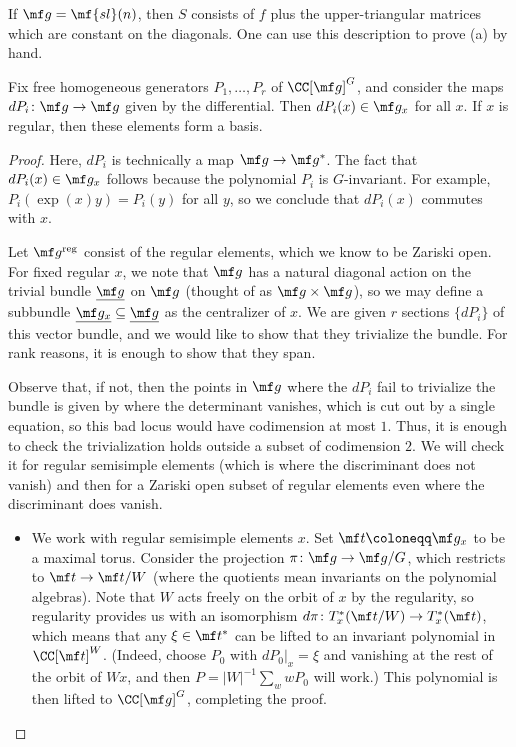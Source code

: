 \documentclass[../notes.tex]{subfiles}
\begin{document}
\begin{example}
	If $\mf g=\mf{sl}(n)$, then $S$ consists of $f$ plus the upper-triangular matrices which are constant on the diagonals. One can use this description to prove (a) by hand.
\end{example}
\begin{lemma} \label{lem:get-kostant-slice}
	Fix free homogeneous generators $P_1,\ldots,P_r$ of $\CC[\mf g]^G$, and consider the maps $dP_i\colon\mf g\to\mf g$ given by the differential. Then $dP_i(x)\in\mf g_x$ for all $x$. If $x$ is regular, then these elements form a basis.
\end{lemma}
\begin{proof}
	Here, $dP_i$ is technically a map $\mf g\to\mf g^*$. The fact that $dP_i(x)\in\mf g_x$ follows because the polynomial $P_i$ is $G$-invariant. For example, $P_i(\exp(x)y)=P_i(y)$ for all $y$, so we conclude that $dP_i(x)$ commutes with $x$.\todo{}

	Let $\mf g^{\mathrm{reg}}$ consist of the regular elements, which we know to be Zariski open. For fixed regular $x$, we note that $\mf g$ has a natural diagonal action on the trivial bundle $\underline{\mf g}$ on $\mf g$ (thought of as $\mf g\times\mf g$), so we may define a subbundle $\underline{\mf g_x}\subseteq\underline{\mf g}$ as the centralizer of $x$. We are given $r$ sections $\{dP_i\}$ of this vector bundle, and we would like to show that they trivialize the bundle. For rank reasons, it is enough to show that they span.
	
	Observe that, if not, then the points in $\mf g$ where the $dP_i$ fail to trivialize the bundle is given by where the determinant vanishes, which is cut out by a single equation, so this bad locus would have codimension at most $1$. Thus, it is enough to check the trivialization holds outside a subset of codimension $2$. We will check it for regular semisimple elements (which is where the discriminant does not vanish) and then for a Zariski open subset of regular elements even where the discriminant does vanish.
	\begin{itemize}
		\item We work with regular semisimple elements $x$. Set $\mf t\coloneqq\mf g_x$ to be a maximal torus. Consider the projection $\pi\colon\mf g\to\mf g/G$, which restricts to $\mf t\to\mf t/W$ (where the quotients mean invariants on the polynomial algebras). Note that $W$ acts freely on the orbit of $x$ by the regularity, so regularity provides us with an isomorphism $d\pi\colon T^*_x(\mf t/W)\to T^*_x(\mf t)$, which means that any $\xi\in\mf t^*$ can be lifted to an invariant polynomial in $\CC[\mf t]^W$. (Indeed, choose $P_0$ with $dP_0|_x=\xi$ and vanishing at the rest of the orbit of $Wx$, and then $P=\left|W\right|^{-1}\sum_wwP_0$ will work.) This polynomial is then lifted to $\CC[\mf g]^G$, completing the proof.


\end{itemize}
\end{proof}
\end{document}

